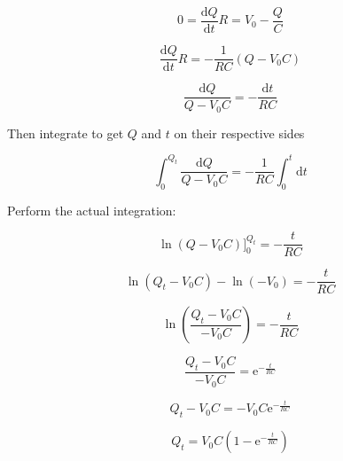 \documentclass[a4paper,12pt]{article}
\begin{document}
						 \begin{equation*}
							0 =	\frac{\mathrm{d}Q}{\mathrm{d}t}R = V_{0} - \frac{Q}{C}
						 \end{equation*}

						 \begin{equation*}
								 \frac{\mathrm{d}Q}{\mathrm{d}t}R = -\frac{1}{RC} \left( Q - V_{0}C \right)
						 \end{equation*}

						\begin{equation*}
								\frac{\mathrm{d}Q}{Q - V_{0}C} = -\frac{\mathrm{d}t}{RC}
						\end{equation*}

						Then integrate to get $Q$ and $t$ on their respective sides

						\begin{equation*}
								\int_{0}^{Q_{t}} \frac{\mathrm{d}Q}{Q - V_{0}C} = -\frac{1}{RC} \int_{0}^{t} \mathrm{d}t
						\end{equation*}

						Perform the actual integration:

						\begin{equation*}
									\ln\left(Q - V_{0}C\right) \Big]_{0}^{Q_{t}} = -\frac{t}{RC}
						\end{equation*}

						\begin{equation*}
								\ln\left(Q_{t} - V_{0}C\right) - \ln\left(-V_{0}\right) = -\frac{t}{RC}
						\end{equation*}

						\begin{equation*}
								\ln\left(\frac{Q_{t} -V_{0}C}{-V_{0}C}\right) = -\frac{t}{RC}
						\end{equation*}
						
						\begin{equation*}
								\frac{Q_{t} -V_{0}C}{-V_{0}C} =\mathrm{e}^{-\frac{t}{RC}}
						\end{equation*}
						
						\begin{equation*}
								Q_{t} - V_{0}C = -V_{0}C\mathrm{e}^{-\frac{t}{RC}}
						\end{equation*}

						\begin{equation*}
								Q_{t} = V_{0}C\left(1-\mathrm{e}^{-\frac{t}{RC}}\right)
						\end{equation*}
\end{document}
